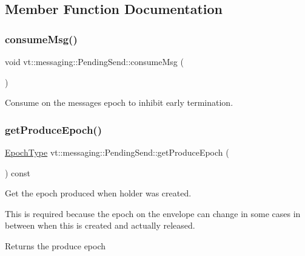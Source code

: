 \subsection{Member Function Documentation}
\mbox{\label{structvt_1_1messaging_1_1_pending_send_a0f249a127a798ba0823fae82c925ed3b}} 
\subsubsection{\texorpdfstring{consume\+Msg()}{consumeMsg()}}
{\footnotesize\ttfamily void vt\+::messaging\+::\+Pending\+Send\+::consume\+Msg (\begin{DoxyParamCaption}{ }\end{DoxyParamCaption})}



Consume on the messages epoch to inhibit early termination. 

\mbox{\label{structvt_1_1messaging_1_1_pending_send_a6e6d77bd24d90496826371b900d1979b}} 
\subsubsection{\texorpdfstring{get\+Produce\+Epoch()}{getProduceEpoch()}}
{\footnotesize\ttfamily \hyperlink{namespacevt_a985a5adf291c34a3ca263b3378388236}{Epoch\+Type} vt\+::messaging\+::\+Pending\+Send\+::get\+Produce\+Epoch (\begin{DoxyParamCaption}{ }\end{DoxyParamCaption}) const}



Get the epoch produced when holder was created. 

This is required because the epoch on the envelope can change in some cases in between when this is created and actually released.

\begin{DoxyReturn}{Returns}
the produce epoch 
\end{DoxyReturn}
\mbox{\label{structvt_1_1messaging_1_1_pending_send_aecef2d10d22564d142b9de52a57d81c8}} 
